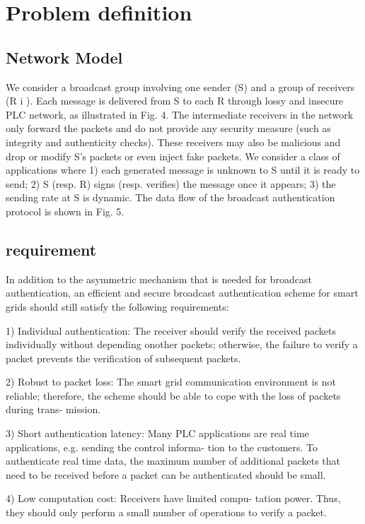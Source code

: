 \documentclass[10pt, conference, compsocconf]{IEEEtran}
\begin{document}
\section{Problem definition}
\subsection{Network Model}
We consider a broadcast group involving one sender (S) and
a group of receivers (R i ). Each message is delivered from S to
each R through lossy and insecure PLC network, as illustrated
in Fig. 4. The intermediate receivers in the network only
forward the packets and do not provide any security measure
(such as integrity and authenticity checks). These receivers
may also be malicious and drop or modify S’s packets or
even inject fake packets.
We consider a class of applications where 1) each generated
message is unknown to S until it is ready to send; 2) S
(resp. R) signs (resp. verifies) the message once it appears;
3) the sending rate at S is dynamic. The data flow of the
broadcast authentication protocol is shown in Fig. 5.

\subsection{requirement}

In addition to the asymmetric mechanism that is needed
for broadcast authentication, an efficient and secure broadcast
authentication scheme for smart grids should still satisfy the
following requirements:

1) Individual authentication: The receiver should verify
the received packets individually without depending onother packets; otherwise, the failure to verify a packet
prevents the verification of subsequent packets.

2) Robust to packet loss: The smart grid communication
environment is not reliable; therefore, the scheme should
be able to cope with the loss of packets during trans-
mission.

3) Short authentication latency: Many PLC applications are
real time applications, e.g. sending the control informa-
tion to the customers. To authenticate real time data, the
maximum number of additional packets that need to be
received before a packet can be authenticated should be
small.

4) Low computation cost: Receivers have limited compu-
tation power. Thus, they should only perform a small
number of operations to verify a packet.
\end{document}

